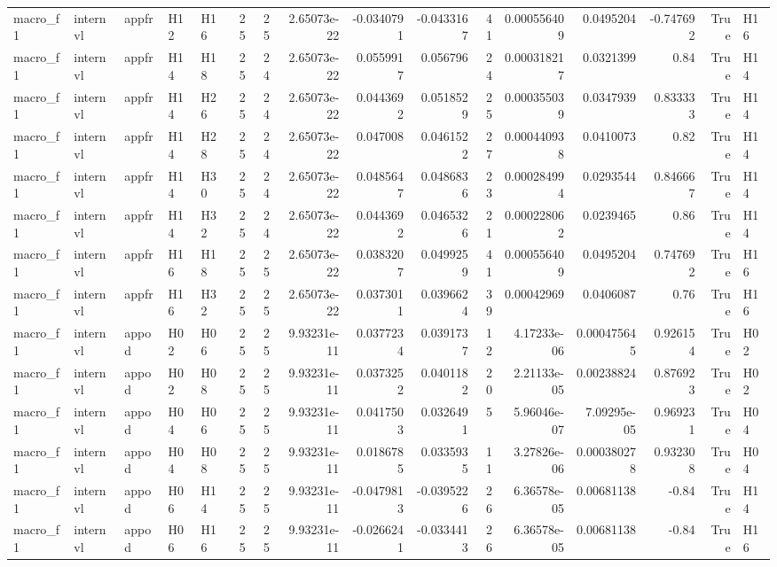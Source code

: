 \begin{table}[tbp]
\begin{tabular}{lllllrrrrrrrrrrl}
macro\_f1 & internvl & appfr & H12 & H16 & 25 & 25 & 2.65073e-22 & -0.0340791 & -0.0433167 & 41 & 0.000556409 & 0.0495204 & -0.747692 & True & H16 \\
macro\_f1 & internvl & appfr & H14 & H18 & 25 & 24 & 2.65073e-22 & 0.0559917 & 0.056796 & 24 & 0.000318217 & 0.0321399 & 0.84 & True & H14 \\
macro\_f1 & internvl & appfr & H14 & H26 & 25 & 24 & 2.65073e-22 & 0.0443692 & 0.0518529 & 25 & 0.000355039 & 0.0347939 & 0.833333 & True & H14 \\
macro\_f1 & internvl & appfr & H14 & H28 & 25 & 24 & 2.65073e-22 & 0.047008 & 0.0461522 & 27 & 0.000440938 & 0.0410073 & 0.82 & True & H14 \\
macro\_f1 & internvl & appfr & H14 & H30 & 25 & 24 & 2.65073e-22 & 0.0485647 & 0.0486836 & 23 & 0.000284994 & 0.0293544 & 0.846667 & True & H14 \\
macro\_f1 & internvl & appfr & H14 & H32 & 25 & 24 & 2.65073e-22 & 0.0443692 & 0.0465326 & 21 & 0.000228062 & 0.0239465 & 0.86 & True & H14 \\
macro\_f1 & internvl & appfr & H16 & H18 & 25 & 25 & 2.65073e-22 & 0.0383207 & 0.0499259 & 41 & 0.000556409 & 0.0495204 & 0.747692 & True & H16 \\
macro\_f1 & internvl & appfr & H16 & H32 & 25 & 25 & 2.65073e-22 & 0.0373011 & 0.0396624 & 39 & 0.00042969 & 0.0406087 & 0.76 & True & H16 \\
macro\_f1 & internvl & appod & H02 & H06 & 25 & 25 & 9.93231e-11 & 0.0377234 & 0.0391737 & 12 & 4.17233e-06 & 0.000475645 & 0.926154 & True & H02 \\
macro\_f1 & internvl & appod & H02 & H08 & 25 & 25 & 9.93231e-11 & 0.0373252 & 0.0401182 & 20 & 2.21133e-05 & 0.00238824 & 0.876923 & True & H02 \\
macro\_f1 & internvl & appod & H04 & H06 & 25 & 25 & 9.93231e-11 & 0.0417503 & 0.0326491 & 5 & 5.96046e-07 & 7.09295e-05 & 0.969231 & True & H04 \\
macro\_f1 & internvl & appod & H04 & H08 & 25 & 25 & 9.93231e-11 & 0.0186785 & 0.0335935 & 11 & 3.27826e-06 & 0.000380278 & 0.932308 & True & H04 \\
macro\_f1 & internvl & appod & H06 & H14 & 25 & 25 & 9.93231e-11 & -0.0479813 & -0.0395226 & 26 & 6.36578e-05 & 0.00681138 & -0.84 & True & H14 \\
macro\_f1 & internvl & appod & H06 & H16 & 25 & 25 & 9.93231e-11 & -0.0266241 & -0.0334413 & 26 & 6.36578e-05 & 0.00681138 & -0.84 & True & H16 \\

\end{tabular}
\end{table}
